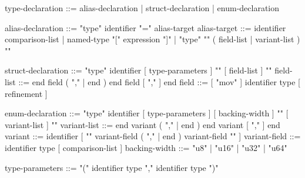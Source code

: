 \label{gram:struct-declaration}\label{gram:enum-declaration}
\begin{grammar}
type-declaration     ::= alias-declaration | struct-declaration | enum-declaration

alias-declaration    ::= "type" identifier "=" alias-target
alias-target         ::=
    identifier comparison-list           %
  | named-type { "[" expression "]" }    %
  | "type" "{" ( field-list | variant-list ) "}"   %

struct-declaration   ::= "type" identifier [ type-parameters ] "{" [ field-list ] "}"
field-list           ::= { end } field { ( "," | end ) { end } field }
                         [ "," ] { end }
field                ::= [ "mov" ] identifier type [ refinement ]

enum-declaration     ::= "type" identifier [ type-parameters ] [ backing-width ]
                         "{" [ variant-list ] "}"
variant-list         ::= { end } variant { ( "," | end ) { end } variant }
                         [ "," ] { end }
variant              ::= identifier
                         [ "{" variant-field { ( "," | end ) variant-field } "}" ]
variant-field        ::= identifier type [ comparison-list ]
backing-width        ::= "u8" | "u16" | "u32" | "u64"          %

type-parameters      ::= "(" identifier type { "," identifier type } ")"
\end{grammar}
